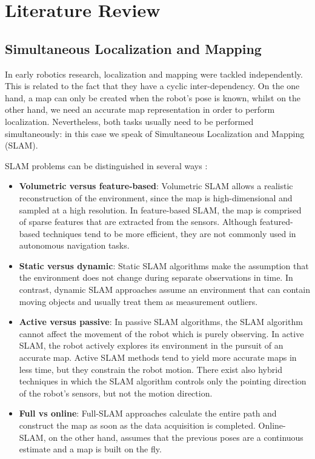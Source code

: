 \section{Literature Review}

\subsection{Simultaneous Localization and Mapping}

In early robotics research, localization and mapping were tackled
independently.
This is related to the fact that they have a cyclic inter-dependency.
On the one hand, a map can only be created when the robot’s pose is known,
whilst on the other hand, we need an accurate map representation in order to
perform localization.
Nevertheless, both tasks usually need to be performed simultaneously:
in this case we speak of Simultaneous Localization and Mapping (SLAM).

SLAM problems can be distinguished in several ways \parencite{Jefferies2008}:
\begin{itemize}
    \item \textbf{Volumetric versus feature-based}:
        Volumetric SLAM allows a realistic reconstruction of the environment,
        since the map is high-dimensional and sampled at a high resolution.
        In feature-based SLAM, the map is comprised of sparse features
        that are extracted from the sensors.
        Although featured-based techniques tend to be more efficient,
        they are not commonly used in autonomous navigation tasks.
    \item \textbf{Static versus dynamic}:
        Static SLAM algorithms make the assumption that the environment
        does not change during separate observations in time.
        In contrast, dynamic SLAM approaches assume an environment that
        can contain moving objects and usually treat them as
        measurement outliers.
    \item \textbf{Active versus passive}:
        In passive SLAM algorithms, the SLAM algorithm cannot affect the
        movement of the robot which is purely observing.
        In active SLAM, the robot actively explores its environment in
        the pursuit of an accurate map.
        Active SLAM methods tend to yield more accurate maps in less time,
        but they constrain the robot motion.
        There exist also hybrid techniques in which the SLAM algorithm
        controls only the pointing direction of the robot's sensors,
        but not the motion direction.
    \item \textbf{Full vs online}:
        Full-SLAM approaches calculate the entire path and construct the
        map as soon as the data acquisition is completed.
        Online-SLAM, on the other hand, assumes that the previous poses are a
        continuous estimate and a map is built on the fly.
\end{itemize}

